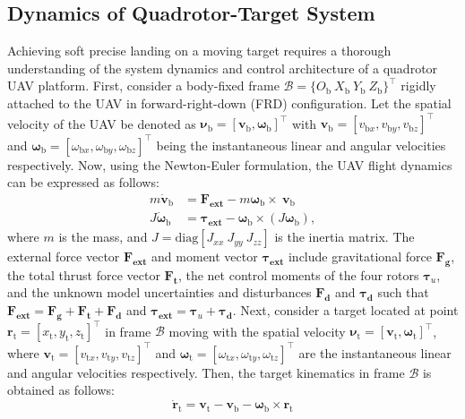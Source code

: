 \documentclass[lettersize,journal]{IEEEtran}
\begin{document}
\subsection{Dynamics of Quadrotor-Target System} \label{quadrotor dynamics: section}
Achieving soft precise landing on a moving target requires a thorough understanding of the system dynamics and control architecture of a quadrotor UAV platform. 
First, consider a body-fixed frame $\mathcal{B}=\{O_{\text{b}} ~X_{\text{b}} ~Y_{\text{b}} ~Z_{\text{b}}\}^{\top}$ rigidly attached to the UAV in forward-right-down (FRD) configuration.
Let the spatial velocity of the UAV be denoted as $\boldsymbol{\nu}_{\text{b}} = [\boldsymbol{v}_{\text{b}}, \boldsymbol{\omega}_{\text{b}}]^{\top}$ with $\boldsymbol{v}_{\text{b}} = [v_{\text{b}x}, v_{\text{b}y}, v_{\text{b}z}]^{\top}$ and $\boldsymbol{\omega}_{\text{b}} = [\omega_{\text{b}x}, \omega_{\text{b}y}, \omega_{\text{b}z}]^{\top}$ being the instantaneous linear and angular velocities respectively.
Now, using the Newton-Euler formulation, the UAV flight dynamics can be expressed as follows:
\begin{align}
\label{quadrotor dynamics: equation}
    m \dot{\boldsymbol{v}}_{\text{b}} &= \boldsymbol{F_{\text{ext}}} - m \boldsymbol{\omega}_{\text{b}} \times ~\boldsymbol{v}_{\text{b}}  \nonumber \\
    J \dot{\boldsymbol{\omega}}_{\text{b}} &= \boldsymbol{\tau_{\text{ext}}} - \boldsymbol{\omega}_{\text{b}} \times (J \boldsymbol{\omega}_{\text{b}}),
\end{align}
where $m$ is the mass,  and $J = \text{diag}[J_{xx}~J_{yy}~J_{zz}]$ is the inertia matrix. The external force vector $\boldsymbol{F_{\text{ext}}}$ and moment vector $\boldsymbol{\tau_{\text{ext}}}$ include gravitational force $\boldsymbol{F_{\text{g}}}$, the total thrust force vector $\boldsymbol{F_{\text{t}}}$, the net control moments of the four rotors $\boldsymbol{\tau}_u$, and the unknown model uncertainties and disturbances $\boldsymbol{F_{\text{d}}}$ and $\boldsymbol{\tau_{\text{d}}}$ such that
$\boldsymbol{F_{\text{ext}}} = \boldsymbol{F_{\text{g}}} + \boldsymbol{F_{\text{t}}} + \boldsymbol{F_{\text{d}}}$ and $\boldsymbol{\tau_{\text{ext}}} = \boldsymbol{\tau}_u + \boldsymbol{\tau_{\text{d}}}$.
Next, consider a target located at point $\boldsymbol{r}_{\text{t}} = [x_{\text{t}}, y_{\text{t}}, z_{\text{t}}]^{\top}$ in frame $\mathcal{B}$ moving with the spatial velocity $\boldsymbol{\nu}_{\text{t}} = [\boldsymbol{v}_{\text{t}}, \boldsymbol{\omega}_{\text{t}}]^{\top}$, where $\boldsymbol{v}_{\text{t}} = [v_{\text{t}x}, v_{\text{t}y}, v_{\text{t}z}]^{\top}$ and $\boldsymbol{\omega}_{\text{t}} = [\omega_{\text{t}x}, \omega_{\text{t}y}, \omega_{\text{t}z}]^{\top}$ are the instantaneous linear and angular velocities respectively. Then, the target kinematics in frame $\mathcal{B}$ is obtained as follows:
\begin{equation} \label{Eq. (1)}
    \dot{\boldsymbol{r}}_{\text{t}} = \boldsymbol{v}_{\text{t}} - \boldsymbol{v}_{\text{b}} - \boldsymbol{\omega}_{\text{b}} \times \boldsymbol{r}_{\text{t}}
\end{equation}
\end{document}
